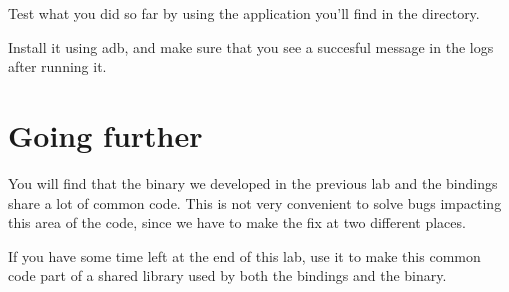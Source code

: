 Test what you did so far by using the  application
you'll find in the  directory.

Install it using adb, and make sure that you see a succesful message
in the logs after running it.

\section{Going further}

You will find that the binary we developed in the previous lab and
the bindings share a lot of common code. This is not very convenient
to solve bugs impacting this area of the code, since we have to make
the fix at two different places.

If you have some time left at the end of this lab, use it to make this
common code part of a shared library used by both the bindings and the
binary.
